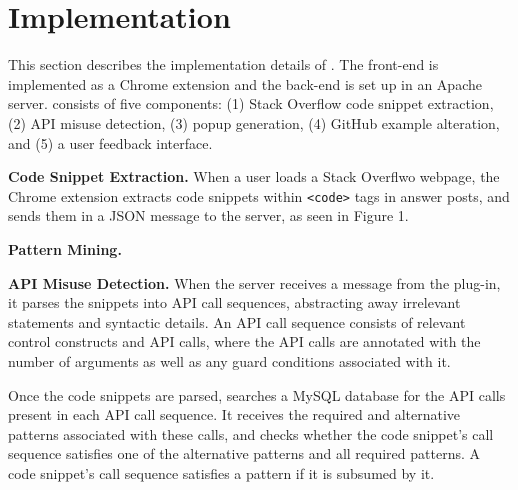 \section{Implementation}
\label{sec:implementation}
This section describes the implementation details of {\soa}. The front-end is implemented as a Chrome extension and the back-end is set up in an Apache server. {\soa} consists of five components: (1) Stack Overflow code snippet extraction, (2) API misuse detection, (3) popup generation, (4) GitHub example alteration, and (5) a user feedback interface.

{\bf Code Snippet Extraction.} When a user loads a Stack Overflwo webpage, the Chrome extension extracts code snippets within {\tt <code>} tags in answer posts, and sends them in a JSON message to the server, as seen in Figure 1.

{\bf Pattern Mining.} 

{\bf API Misuse Detection.} When the server receives a message from the plug-in, it parses the snippets into API call sequences, abstracting away irrelevant statements and syntactic details. An API call sequence consists of relevant control constructs and API calls, where the API calls are annotated with the number of arguments as well as any guard conditions associated with it.

Once the code snippets are parsed, {\soa} searches a MySQL database for the API calls present in each API call sequence. It receives the required and alternative patterns associated with these calls, and checks whether the code snippet's call sequence satisfies one of the alternative patterns and all required patterns. A code snippet's call sequence satisfies a pattern if it is subsumed by it.

